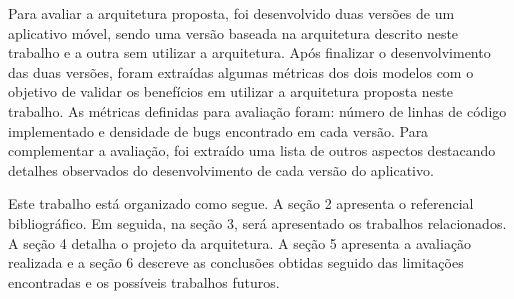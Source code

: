 Para avaliar a arquitetura proposta, foi desenvolvido duas versões de um aplicativo móvel, sendo uma versão baseada na arquitetura descrito neste trabalho e a outra sem utilizar a arquitetura. Após finalizar o desenvolvimento das duas versões, foram extraídas algumas métricas dos dois modelos com o objetivo de validar os benefícios em utilizar a arquitetura proposta neste trabalho. As métricas definidas para avaliação foram: número de linhas de código implementado e densidade de bugs encontrado em cada versão. Para complementar a avaliação, foi extraído uma lista de outros aspectos destacando detalhes observados do desenvolvimento de cada versão do aplicativo.

Este trabalho está organizado como segue. A seção 2 apresenta o referencial bibliográfico. Em seguida, na seção 3, será apresentado os trabalhos relacionados. A seção 4 detalha o projeto da arquitetura. A seção 5 apresenta a avaliação realizada e a seção 6 descreve as conclusões obtidas seguido das limitações encontradas e os possíveis trabalhos futuros.